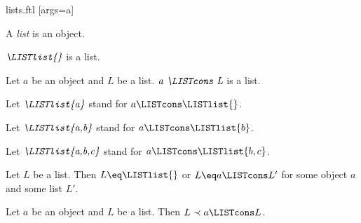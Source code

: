 \documentclass{naproche-library}
\begin{document}
\begin{smodule}[title=Lists]{lists.ftl}
[args=a]{}

\begin{signature}[forthel,id=ListSig]
  A \emph{list} is an object.
\end{signature}

\begin{signature}[forthel,id=NilSig]
  $\emph{\LISTlist{}}$ is a list.
\end{signature}

\begin{signature}[forthel,id=ConsSig]
  Let $a$ be an object and $L$ be a list.
  $\emph{a \LISTcons L}$ is a list.

  Let $\emph{\LISTlist{a}}$ stand for $a \LISTcons \LISTlist{}$.
  
  Let $\emph{\LISTlist{a,b}}$ stand for $a \LISTcons \LISTlist{b}$.
  
  Let $\emph{\LISTlist{a,b,c}}$ stand for $a \LISTcons \LISTlist{b,c}$.
\end{signature}

\begin{axiom}[forthel,id=ListExhaustionAx]
  Let $L$ be a list.
  Then $L \eq \LISTlist{}$ or $L \eq a \LISTcons L'$ for some object $a$ and some list $L'$.
\end{axiom}

\begin{axiom}[forthel,id=ListInductionAx]
  Let $a$ be an object and $L$ be a list.
  Then $L \prec a \LISTcons L$.
\end{axiom}
\end{smodule}
\end{document}
